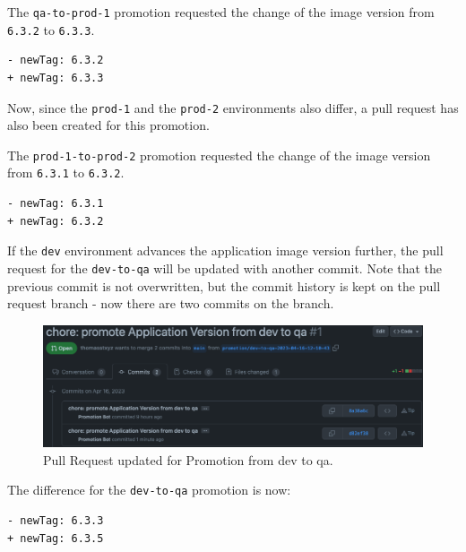 The \lstinline|qa-to-prod-1| promotion requested the change of the image version from
\lstinline|6.3.2| to \lstinline|6.3.3|.

\begin{lstlisting}
- newTag: 6.3.2
+ newTag: 6.3.3
\end{lstlisting}

Now, since the \lstinline|prod-1| and the \lstinline|prod-2| environments
also differ,
a pull request has also been created for this promotion.


The \lstinline|prod-1-to-prod-2| promotion requested the change of the image version from
\lstinline|6.3.1| to \lstinline|6.3.2|.

\begin{lstlisting}
- newTag: 6.3.1
+ newTag: 6.3.2
\end{lstlisting}

If the \lstinline|dev| environment advances the application image version further,
the pull request for the \lstinline|dev-to-qa| will be updated with another commit.
Note that the previous commit is not overwritten, 
but the commit history is kept on the pull request branch - now there are two commits on the branch.

\begin{figure}[h]
	\centering
	\includegraphics[width=1.00\linewidth]{assets/prom-pr-dev-to-qa-round2.png}
	\caption{Pull Request updated for Promotion from dev to qa.
	}
	\label{fig:prom-pr-dev-to-qa-round2}	
\end{figure}

The difference for the \lstinline|dev-to-qa| promotion is now:

\begin{lstlisting}
- newTag: 6.3.3
+ newTag: 6.3.5
\end{lstlisting}


